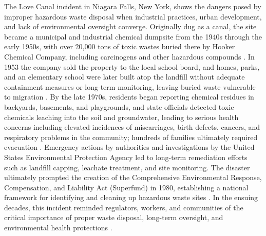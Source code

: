 The Love Canal incident in Niagara Falls, New York, shows the dangers posed by improper hazardous waste disposal when industrial practices, urban development, and lack of environmental oversight converge. Originally dug as a canal, the site became a municipal and industrial chemical dumpsite from the 1940s through the early 1950s, with over 20,000 tons of toxic wastes buried there by Hooker Chemical Company, including carcinogens and other hazardous compounds \cite{EPA_LoveCanal, LevinCenter_LoveCanal}. In 1953 the company sold the property to the local school board, and homes, parks, and an elementary school were later built atop the landfill without adequate containment measures or long-term monitoring, leaving buried waste vulnerable to migration \cite{LevinCenter_LoveCanal, Geneseo_LoveCanal}. By the late 1970s, residents began reporting chemical residues in backyards, basements, and playgrounds, and state officials detected toxic chemicals leaching into the soil and groundwater, leading to serious health concerns including elevated incidences of miscarriages, birth defects, cancers, and respiratory problems in the community; hundreds of families ultimately required evacuation \cite{EPA_LoveCanal, LevinCenter_LoveCanal}. Emergency actions by authorities and investigations by the United States Environmental Protection Agency led to long-term remediation efforts such as landfill capping, leachate treatment, and site monitoring. The disaster ultimately prompted the creation of the Comprehensive Environmental Response, Compensation, and Liability Act (Superfund) in 1980, establishing a national framework for identifying and cleaning up hazardous waste sites \cite{LevinCenter_LoveCanal}. In the ensuing decades, this incident reminded regulators, workers, and communities of the critical importance of proper waste disposal, long-term oversight, and environmental health protections \cite{EPA_LoveCanal, LevinCenter_LoveCanal, Geneseo_LoveCanal}.

